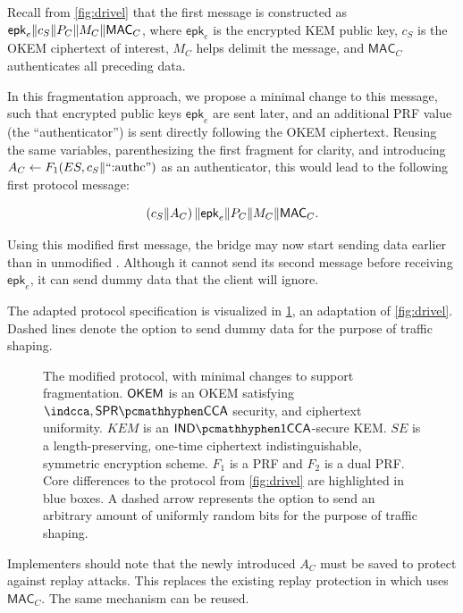 Recall from \cref{fig:drivel} that the first \drivel{} message is constructed as $\mathsf{epk}_e \| c_S \| P_C \| M_C \| \mathsf{MAC}_C$, where $\mathsf{epk}_e$ is the encrypted KEM public key, $c_S$ is the OKEM ciphertext of interest, $M_C$ helps delimit the message, and $\mathsf{MAC}_C$ authenticates all preceding data.

In this fragmentation approach, we propose a minimal change to this message, such that encrypted public keys $\mathsf{epk}_e$ are sent later, and an additional PRF value (the ``authenticator'') is sent directly following the OKEM ciphertext. Reusing the same variables, parenthesizing the first fragment for clarity, and introducing $A_C \gets F_1(ES, c_S \| \text{``:authc''})$ as an authenticator, this would lead to the following first protocol message:

\[
    \left( c_S \| A_C \right) \| \mathsf{epk}_e \| P_C \| M_C \| \mathsf{MAC}_C .
\]

Using this modified first message, the bridge may now start sending data earlier than in unmodified \drivel{}. Although it cannot send its second message before receiving $\mathsf{epk}_e$, it can send dummy data that the client will ignore.

The adapted protocol specification is visualized in \cref{fig:modified-drivel-minimal}, an adaptation of \cref{fig:drivel}. Dashed lines denote the option to send dummy data for the purpose of traffic shaping.

\begin{figure}
    
    \caption[
        The modified \drivel{} protocol, with minimal changes to support fragmentation.
    ]{
        The modified \drivel{} protocol, with minimal changes to support fragmentation.
        $\mathsf{OKEM}$ is an OKEM satisfying $\indcca, \sprcca$ security, and ciphertext uniformity.
        $KEM$ is an $\indonecca$-secure KEM.
        $SE$ is a length-preserving, one-time ciphertext indistinguishable, symmetric encryption scheme.
        $F_1$ is a PRF and $F_2$ is a dual PRF.
        Core differences to the \drivel{} protocol from \cref{fig:drivel} are highlighted in blue boxes.
        A dashed arrow represents the option to send an arbitrary amount of uniformly random bits for the purpose of traffic shaping.
    }
    \label{fig:modified-drivel-minimal}
\end{figure}

Implementers should note that the newly introduced $A_C$ must be saved to protect against replay attacks. This replaces the existing replay protection in \obfsfour{} which uses $\mathsf{MAC}_C$. The same mechanism can be reused.

